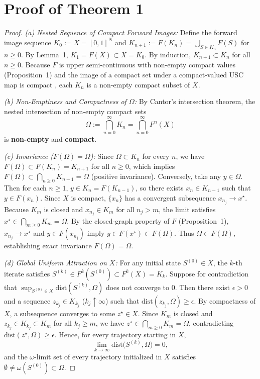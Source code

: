 \documentclass[11pt]{article}
\newcommand{\rev}[1]{#1}
\newenvironment{IEEEproof}{\begin{proof}}{\end{proof}}
\begin{document}
\section{Proof of Theorem 1}
\label{app:proof_thm_attractor}
\begin{IEEEproof}
\rev{\textit{(a) Nested Sequence of Compact Forward Images:}
Define the forward image sequence $K_0 := X = [0,1]^N$ and $K_{n+1} := F(K_n) = \bigcup_{S \in K_n} F(S)$ for $n \ge 0$. By Lemma~1, $K_1 = F(X) \subset X = K_0$. By induction, $K_{n+1} \subset K_n$ for all $n \ge 0$. Because $F$ is upper semi-continuous with non-empty compact values (Proposition~1) and the image of a compact set under a compact-valued USC map is compact \cite{Aubin1984Differential}, each $K_n$ is a non-empty compact subset of $X$.

\textit{(b) Non-Emptiness and Compactness of $\Omega$:}
By Cantor's intersection theorem, the nested intersection of non-empty compact sets
\begin{equation}
\Omega := \bigcap_{n=0}^{\infty} K_n = \bigcap_{n=0}^{\infty} F^n(X)
\end{equation}
is \textbf{non-empty} and \textbf{compact}.

\textit{(c) Invariance ($F(\Omega) = \Omega$):}
Since $\Omega \subset K_n$ for every $n$, we have $F(\Omega) \subset F(K_n) = K_{n+1}$ for all $n \ge 0$, which implies $F(\Omega) \subset \bigcap_{n\ge 0} K_{n+1} = \Omega$ (positive invariance). Conversely, take any $y \in \Omega$. Then for each $n \ge 1$, $y \in K_n = F(K_{n-1})$, so there exists $x_n \in K_{n-1}$ such that $y \in F(x_n)$. Since $X$ is compact, $\{x_n\}$ has a convergent subsequence $x_{n_j} \to x^\star$. Because $K_m$ is closed and $x_{n_j} \in K_m$ for all $n_j > m$, the limit satisfies $x^\star \in \bigcap_{m\ge 0} K_m = \Omega$. By the closed-graph property of $F$ (Proposition~1), $x_{n_j} \to x^\star$ and $y \in F(x_{n_j})$ imply $y \in F(x^\star) \subset F(\Omega)$. Thus $\Omega \subset F(\Omega)$, establishing exact invariance $F(\Omega) = \Omega$.

\textit{(d) Global Uniform Attraction on $X$:}
For any initial state $S^{(0)} \in X$, the $k$-th iterate satisfies $S^{(k)} \in F^k(S^{(0)}) \subset F^k(X) = K_k$. Suppose for contradiction that $\sup_{S^{(0)}\in X}\mathrm{dist}(S^{(k)}, \Omega)$ does not converge to $0$. Then there exist $\epsilon > 0$ and a sequence $z_{k_j} \in K_{k_j}$ ($k_j \uparrow \infty$) such that $\mathrm{dist}(z_{k_j}, \Omega) \ge \epsilon$. By compactness of $X$, a subsequence converges to some $z^\star \in X$. Since $K_m$ is closed and $z_{k_j} \in K_{k_j} \subset K_m$ for all $k_j \ge m$, we have $z^\star \in \bigcap_{m\ge 0} K_m = \Omega$, contradicting $\mathrm{dist}(z^\star, \Omega) \ge \epsilon$. Hence, for every trajectory starting in $X$,
\begin{equation}
\lim_{k\to\infty}\mathrm{dist}\big(S^{(k)},\Omega\big) = 0,
\end{equation}
and the $\omega$-limit set of every trajectory initialized in $X$ satisfies $\emptyset \neq \omega(S^{(0)}) \subset \Omega$.}
\end{IEEEproof}
\end{document}
